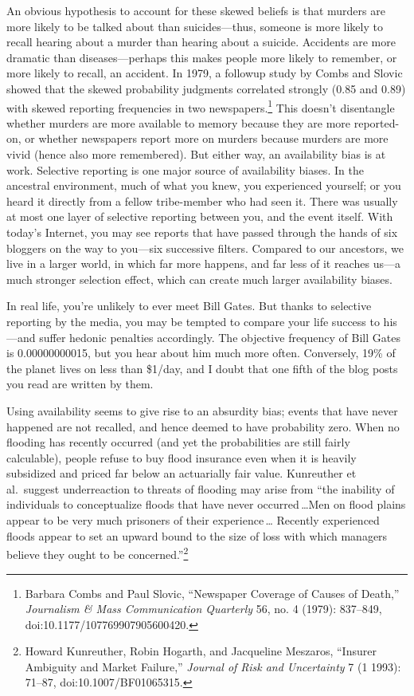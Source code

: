 {
 An obvious hypothesis to account for these skewed beliefs is that
murders are more likely to be talked about than suicides---thus,
someone is more likely to recall hearing about a murder than hearing
about a suicide. Accidents are more dramatic than diseases---perhaps
this makes people more likely to remember, or more likely to recall, an
accident. In 1979, a followup study by Combs and Slovic showed that the
skewed probability judgments correlated strongly (0.85 and 0.89) with
skewed reporting frequencies in two newspapers.\footnote{Barbara Combs and Paul Slovic, ``Newspaper
Coverage of Causes of Death,'' \textit{Journalism \&
Mass Communication Quarterly} 56, no. 4 (1979): 837--849,
doi:10.1177/107769907905600420.} This
doesn't disentangle whether murders are more available
to memory because they are more reported-on, or whether newspapers
report more on murders because murders are more vivid (hence also more
remembered). But either way, an availability bias is at work. Selective
reporting is one major source of availability biases. In the ancestral
environment, much of what you knew, you experienced yourself; or you
heard it directly from a fellow tribe-member who had seen it. There was
usually at most one layer of selective reporting between you, and the
event itself. With today's Internet, you may see
reports that have passed through the hands of six bloggers on the way
to you---six successive filters. Compared to our ancestors, we live in
a larger world, in which far more happens, and far less of it reaches
us---a much stronger selection effect, which can create much larger
availability biases.}

{
 In real life, you're unlikely to ever meet Bill
Gates. But thanks to selective reporting by the media, you may be
tempted to compare your life success to his---and suffer hedonic
penalties accordingly. The objective frequency of Bill Gates is
0.00000000015, but you hear about him much more often. Conversely, 19\%
of the planet lives on less than \$1/day, and I doubt that one fifth of
the blog posts you read are written by them.}

{
 Using availability seems to give rise to an absurdity bias; events
that have never happened are not recalled, and hence deemed to have
probability zero. When no flooding has recently occurred (and yet the
probabilities are still fairly calculable), people refuse to buy flood
insurance even when it is heavily subsidized and priced far below an
actuarially fair value. Kunreuther et al.~suggest underreaction to
threats of flooding may arise from ``the inability of
individuals to conceptualize floods that have never occurred\,\ldots Men
on flood plains appear to be very much prisoners of their experience\,\ldots
Recently experienced floods appear to set an upward bound to the
size of loss with which managers believe they ought to be
concerned.''\footnote{Howard Kunreuther, Robin Hogarth, and Jacqueline Meszaros,
``Insurer Ambiguity and Market
Failure,'' \textit{Journal of Risk and Uncertainty} 7
(1 1993): 71--87, doi:10.1007/BF01065315.}}

